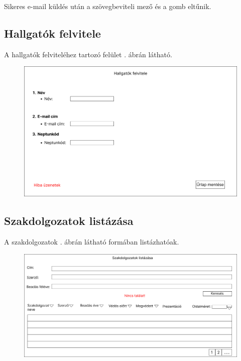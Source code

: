 \documentclass[a4paper,12pt]{article}
\begin{document}
Sikeres e-mail küldés után a szövegbeviteli mező és a gomb eltűnik.

\subsection{Hallgatók felvitele}

A hallgatók felviteléhez tartozó felület . ábrán látható.

\begin{figure}
	\centering
	\includegraphics[width=\textwidth]{images/Web_pages/Enrollment_of_students.png}
	\caption{}
	\label{fig:Enrollment_of_students}
\end{figure}

\subsection{Szakdolgozatok listázása}

A szakdolgozatok . ábrán látható formában listázhatóak.

\begin{figure}
	\centering
	\includegraphics[width=\textwidth]{images/Web_pages/Thesis_List.jpg}
	\caption{}
	\label{fig:Thesis_List}
\end{figure}
\end{document}
